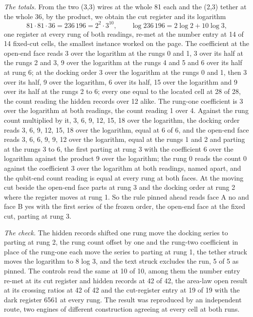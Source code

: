 \begin{chproof}
\textit{The totals.} From the two (3,3) wires at the whole 81 each and the (2,3) tether at the whole 36, by the product, we obtain the cut register and its logarithm
\begin{equation}
81\cdot 81\cdot 36 = 236\,196 = 2^{2}\cdot 3^{10}, \qquad \log 236\,196 = 2\log 2 + 10\log 3,
\end{equation}
one register at every rung of both readings, re-met at the number entry at 14 of 14 fixed-cut cells, the smallest instance worked on the page. The coefficient at the open-end face reads 3 over the logarithm at the rungs 0 and 1, 3 over its half at the rungs 2 and 3, 9 over the logarithm at the rungs 4 and 5 and 6 over its half at rung 6; at the docking order 3 over the logarithm at the rungs 0 and 1, then 3 over its half, 9 over the logarithm, 6 over its half, 15 over the logarithm and 9 over its half at the rungs 2 to 6; every one equal to the located cell at 28 of 28, the count reading the hidden records over 12 alike. The rung-one coefficient is 3 over the logarithm at both readings, the count reading 1 over 4. Against the rung count multiplied by it, 3, 6, 9, 12, 15, 18 over the logarithm, the docking order reads 3, 6, 9, 12, 15, 18 over the logarithm, equal at 6 of 6, and the open-end face reads 3, 6, 6, 9, 9, 12 over the logarithm, equal at the rungs 1 and 2 and parting at the rungs 3 to 6, the first parting at rung 3 with the coefficient 6 over the logarithm against the product 9 over the logarithm; the rung 0 reads the count 0 against the coefficient 3 over the logarithm at both readings, named apart, and the qubit-end count reading is equal at every rung at both faces. At the moving cut beside the open-end face parts at rung 3 and the docking order at rung 2 where the register moves at rung 1. So the rule pinned ahead reads face A no and face B yes with the first series of the frozen order, the open-end face at the fixed cut, parting at rung 3.

\textit{The check.} The hidden records shifted one rung move the docking series to parting at rung 2, the rung count offset by one and the rung-two coefficient in place of the rung-one each move the series to parting at rung 1, the tether struck moves the logarithm to 8 log 3, and the text struck excludes the run, 5 of 5 as pinned. The controls read the same at 10 of 10, among them the number entry re-met at its cut register and hidden records at 42 of 42, the area-law open result at its crossing ratios at 42 of 42 and the cut-register entry at 19 of 19 with the dark register 6561 at every rung. The result was reproduced by an independent route, two engines of different construction agreeing at every cell at both runs.
\end{chproof}
